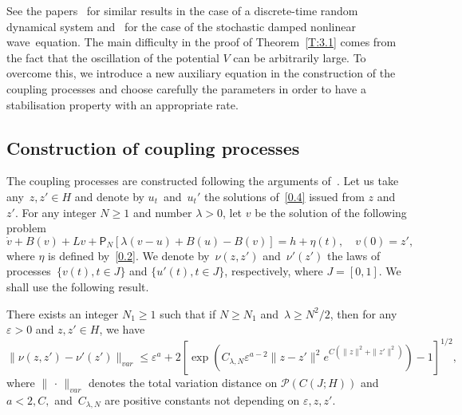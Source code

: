 \documentclass[AHL,Unicode,longabstracts]{cedram}
\newcommand{\e}{\varepsilon}
\newcommand{\PP}{{\mathcal P}}
\newcommand{\la}{\lambda}
\begin{document}
See the papers~\cite{JNPS-2012, JNPS-2014, MN-2017} for similar results in the case of a discrete-time random dynamical system and~\cite{MN-2015} for the case of the stochastic damped nonlinear wave~equation. The main difficulty in the proof of Theorem~\ref{T:3.1} comes from the fact that the oscillation of the potential $V$ can be arbitrarily large. To overcome this, we introduce a new auxiliary equation in the construction of the coupling processes and choose carefully the parameters in order to have a stabilisation property with an appropriate rate.

\subsection{Construction of coupling processes} \label{S:3.1}

The coupling processes are constructed following the arguments of~\cite{MN-2015}. Let us take any~$z,z' \in H$ and denote by $u_t$~and~$u_t'$ the solutions of~\eqref{0.4} issued from $z$ and~$z'$. For any integer $N\ge 1$ and number $\la>0$, let $v$ be the solution of the following problem
\begin{equation}\label{auxi}
\dot v + B(v) + Lv + {\mathsf P}_N[\la(v-u)+B(u)-B(v)] = h + \eta(t), \quad v(0)=z',
\end{equation}
where $\eta$ is defined by~\eqref{0.2}. We denote by~$\nu(z,z')$ and~$\nu'(z')$ the laws of processes~$\{v(t), t\in J\}$ and $\{u'(t), t\in J\}$, respectively, where $J=[0,1]$. We shall use the following result.

\begin{prop}\label{P:dist}
There exists an integer $N_1\ge1$ such that if $N\ge N_1$ and~$\la\ge N^2/2 $, then for any~$\e>0$ and $z,z'\in H$, we have
\begin{equation}\label{eoejtnvf}
\| \nu(z,z')-\nu'(z')\|_{var}\le \e^a+ 2 \left[\exp\left(C_{\la,N} \e^{a-2}\|z-z'\|^2 e^{C(\|z\|^2+\|z'\|^2)} \right)-1\right]^{1/2},
\end{equation}
where $\|{\,\cdot\,}\|_{var}$ denotes the total variation distance on $\PP(C(J; H))$ and $a<2, C,$ and~$C_{\la,N}$ are positive constants not depending on $\e, z,z'$.
\end{prop}
\end{document}
